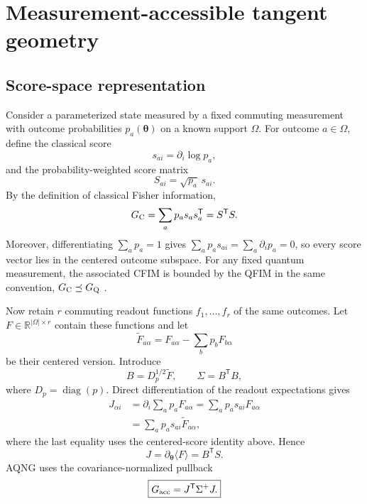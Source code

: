\section{Measurement-accessible tangent geometry}

\subsection{Score-space representation}
Consider a parameterized state measured by a fixed commuting measurement with outcome probabilities $p_a(\bm\theta)$ on a known support $\Omega$. For outcome $a\in\Omega$, define the classical score
\begin{equation}
 s_{ai}=\partial_i\log p_a,
\end{equation}
and the probability-weighted score matrix
\begin{equation}
 S_{ai}=\sqrt{p_a}\,s_{ai}.
\end{equation}
By the definition of classical Fisher information,
\begin{equation}
 G_{\rm C}=\sum_a p_a s_a s_a^{\mathsf T}=S^{\mathsf T}S.
\end{equation}
Moreover, differentiating $\sum_a p_a=1$ gives $\sum_a p_a s_{ai}=\sum_a\partial_i p_a=0$, so every score vector lies in the centered outcome subspace. For any fixed quantum measurement, the associated CFIM is bounded by the QFIM in the same convention, $G_{\rm C}\preceq G_{\rm Q}$ \cite{Braunstein1994}.

Now retain $r$ commuting readout functions $f_1,\ldots,f_r$ of the same outcomes. Let $F\in\mathbb R^{|\Omega|\times r}$ contain these functions and let
\begin{equation}
 \widetilde F_{a\alpha}=F_{a\alpha}-\sum_b p_bF_{b\alpha}
\end{equation}
be their centered version. Introduce
\begin{equation}
 B=D_p^{1/2}\widetilde F,
 \qquad
 \Sigma=B^{\mathsf T}B,
\end{equation}
where $D_p=\operatorname{diag}(p)$. Direct differentiation of the readout expectations gives
\begin{align}
J_{\alpha i}
&=\partial_i\sum_a p_a F_{a\alpha}
 =\sum_a p_a s_{ai}F_{a\alpha}\\
&=\sum_a p_a s_{ai}\widetilde F_{a\alpha},
\end{align}
where the last equality uses the centered-score identity above. Hence
\begin{equation}
 J=\partial_{\bm\theta}\langle F\rangle=B^{\mathsf T}S.
\end{equation}
AQNG uses the covariance-normalized pullback
\begin{equation}
 \boxed{G_{\mathrm{acc}}=J^{\mathsf T}\Sigma^{+}J.}
 \label{eq:gacc}
\end{equation}

